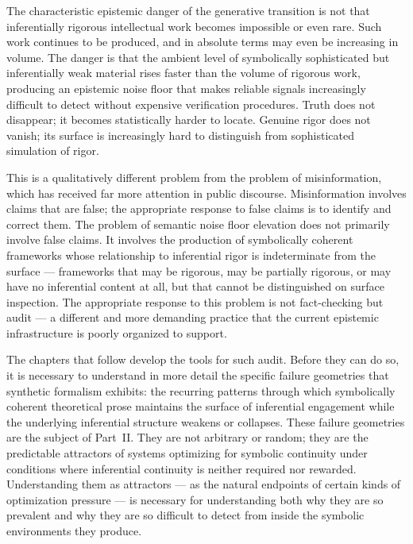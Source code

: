\documentclass[12pt, openright, twoside]{book}
\begin{document}
The characteristic epistemic danger of the generative transition is not that
inferentially rigorous intellectual work becomes impossible or even rare. Such
work continues to be produced, and in absolute terms may even be increasing
in volume. The danger is that the ambient level of symbolically sophisticated
but inferentially weak material rises faster than the volume of rigorous work,
producing an epistemic noise floor that makes reliable signals increasingly
difficult to detect without expensive verification procedures. Truth does not
disappear; it becomes statistically harder to locate. Genuine rigor does not
vanish; its surface is increasingly hard to distinguish from sophisticated
simulation of rigor.

This is a qualitatively different problem from the problem of misinformation,
which has received far more attention in public discourse. Misinformation
involves claims that are false; the appropriate response to false claims is
to identify and correct them. The problem of semantic noise floor elevation
does not primarily involve false claims. It involves the production of
symbolically coherent frameworks whose relationship to inferential rigor is
indeterminate from the surface --- frameworks that may be rigorous, may be
partially rigorous, or may have no inferential content at all, but that
cannot be distinguished on surface inspection. The appropriate response to
this problem is not fact-checking but audit --- a different and more demanding
practice that the current epistemic infrastructure is poorly organized to
support.

The chapters that follow develop the tools for such audit. Before they can
do so, it is necessary to understand in more detail the specific failure
geometries that synthetic formalism exhibits: the recurring patterns through
which symbolically coherent theoretical prose maintains the surface of
inferential engagement while the underlying inferential structure weakens or
collapses. These failure geometries are the subject of Part~II. They are
not arbitrary or random; they are the predictable attractors of systems
optimizing for symbolic continuity under conditions where inferential
continuity is neither required nor rewarded. Understanding them as attractors
--- as the natural endpoints of certain kinds of optimization pressure ---
is necessary for understanding both why they are so prevalent and why they
are so difficult to detect from inside the symbolic environments they produce.

\clearpage
\end{document}
